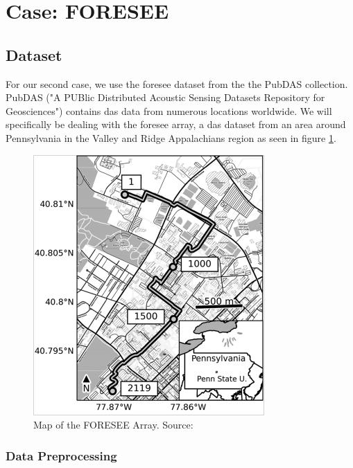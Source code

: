 \section{Case: FORESEE}

\subsection{Dataset}

For our second case, we use the \acrshort{foresee} dataset from the the PubDAS \cite{spica2023pubdas} collection. PubDAS ("A PUBlic Distributed Acoustic Sensing Datasets Repository for Geosciences") contains \acrshort{das} data from numerous locations worldwide. We will specifically be dealing with the \acrshort{foresee} \cite{zhu2019penn, se-12-219-2021} array, a \acrshort{das} dataset from an area around Pennsylvania in the Valley and Ridge Appalachians region as seen in figure \ref{fig:foresee}. \\

\begin{figure}[!h]
    \centering
    \includegraphics[width=0.5\linewidth]{figures/foresee.png}
    \caption{Map of the FORESEE Array. Source: \cite{spica2023pubdas}}
    \label{fig:foresee}
\end{figure}

\subsubsection{Data Preprocessing}
\label{exp:fordata}

